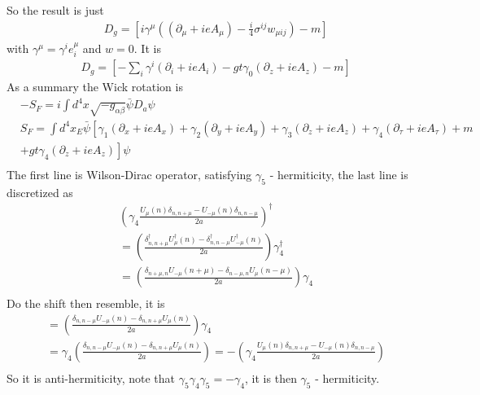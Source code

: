 So the result is just
\begin{equation}
\begin{split}
&D_g=\left[i\gamma ^{\mu}\left((\partial _{\mu}+ieA_{\mu})-\frac{i}{4}\sigma ^{ij}w_{\mu ij}\right)-m\right]
\end{split}
\end{equation}
with $\gamma ^{\mu}=\gamma ^i e_i^{\mu}$ and $w=0$. It is
\begin{equation}
\begin{split}
&D_g=\left[-\sum _i \gamma ^i\left(\partial _i+ieA_i\right)-gt \gamma _0\left(\partial _z+ieA_z\right) -m\right]
\end{split}
\end{equation}
As a summary the Wick rotation is
\begin{equation}
\begin{split}
&-S_F=i\int d^4 x \sqrt{-g_{\alpha \beta}}\bar{\psi } D_a \psi\\
&S_F=\int d^4 x_E \bar{\psi } \left[\gamma _1 (\partial _x+ieA_x)+\gamma _2(\partial _y+ieA_y)+\gamma _3 (\partial _z+ieA_z)+\gamma _4 (\partial _{\tau}+ieA_{\tau})+m\right.\\
&\left.+gt \gamma _4 \left(\partial _z+ieA_z\right)\right] \psi\\
\end{split}
\end{equation}
The first line is Wilson-Dirac operator, satisfying $\gamma _5$ - hermiticity, the last line is discretized as
\begin{equation}
\begin{split}
&\left(\gamma _4\frac{U_{\mu}(n)\delta _{n,n+\mu}-U_{-\mu}(n)\delta _{n,n-\mu}}{2a}\right)^{\dagger}\\
&=\left(\frac{\delta _{n,n+\mu}^{\dagger}U^{\dagger}_{\mu}(n)-\delta _{n,n-\mu} ^{\dagger}U^{\dagger}_{-\mu}(n)}{2a}\right)\gamma _4^{\dagger}\\
&=\left(\frac{\delta _{n+\mu,n}U_{-\mu}(n + \mu)-\delta _{n-\mu,n} U_{\mu}(n-\mu)}{2a}\right)\gamma _4\\
\end{split}
\end{equation}
Do the shift then resemble, it is
\begin{equation}
\begin{split}
&=\left(\frac{\delta _{n,n-\mu}U_{-\mu}(n)-\delta _{n,n+\mu} U_{\mu}(n)}{2a}\right)\gamma _4\\
&=\gamma _4\left(\frac{\delta _{n,n-\mu}U_{-\mu}(n)-\delta _{n,n+\mu} U_{\mu}(n)}{2a}\right)=-\left(\gamma _4\frac{U_{\mu}(n)\delta _{n,n+\mu}-U_{-\mu}(n)\delta _{n,n-\mu}}{2a}\right)\\
\end{split}
\end{equation}
So it is anti-hermiticity, note that $\gamma _5 \gamma _4 \gamma _5 = - \gamma _4$, it is then $\gamma _5$ - hermiticity.

